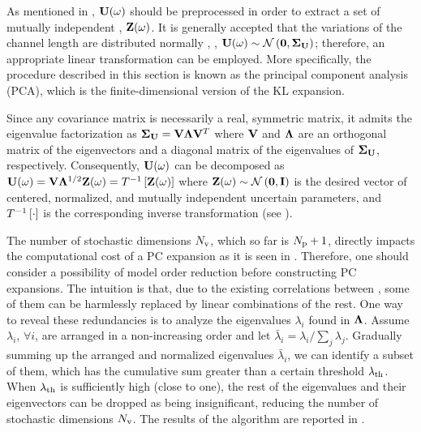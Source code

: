 As mentioned in , $\mathbf{U}(\omega)$ should be preprocessed in order to extract a set of mutually independent \rvs, $\mathbf{Z}(\omega)$. It is generally accepted that the variations of the channel length are distributed normally \cite{juan2011, juan2012, srivastava2010}, \ie, $\vU(\o) \sim \normal{\vZero}{\mCov_\vU}$; therefore, an appropriate linear transformation can be employed. More specifically, the procedure described in this section is known as the principal component analysis (PCA), which is the finite-dimensional version of the KL expansion.

Since any covariance matrix is necessarily a real, symmetric matrix, it admits the eigenvalue factorization \cite{press2007} as $\mCov_\vU = \m{V} \m{\Lambda} \m{V}^T$ where $\m{V}$ and $\m{\Lambda}$ are an orthogonal matrix of the eigenvectors and a diagonal matrix of the eigenvalues of $\mCov_\vU$, respectively. Consequently, $\mathbf{U}(\omega)$ can be decomposed as $\vU(\o) = \m{V} \m{\Lambda}^\ifrac{1}{2} \vZ(\o) = \oInvTransform{\vZ(\o)}$ where $\vZ(\o) \sim \normal{\vZero}{\mI}$ is the desired vector of centered, normalized, and mutually independent uncertain parameters, and $T^{-1}\left[\cdot\right]$ is the corresponding inverse transformation (see ).

The number of stochastic dimensions ${N_\text{v}}$, which so far is ${N_\text{p}} + 1$, directly impacts the computational cost of a PC expansion as it is seen in . Therefore, one should consider a possibility of model order reduction before constructing PC expansions. The intuition is that, due to the existing correlations between \rvs, some of them can be harmlessly replaced by linear combinations of the rest. One way to reveal these redundancies is to analyze the eigenvalues $\lambda_i$ found in $\m{\Lambda}$. Assume $\lambda_i$, $\forall i$, are arranged in a non-increasing order and let $\bar{\lambda}_i = \lambda_i / \sum_j \lambda_j$. Gradually summing up the arranged and normalized eigenvalues $\bar{\lambda}_i$, we can identify a subset of them, which has the cumulative sum greater than a certain threshold $\lambda_\text{th}$. When $\lambda_\text{th}$ is sufficiently high (close to one), the rest of the eigenvalues and their eigenvectors can be dropped as being insignificant, reducing the number of stochastic dimensions ${N_\text{v}}$. The results of the algorithm are reported in .
